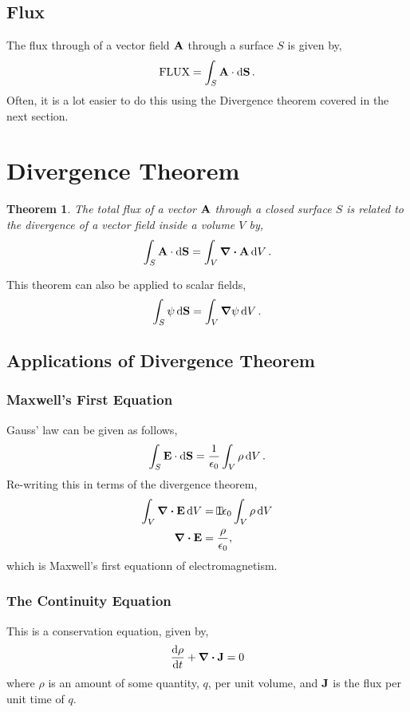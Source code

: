 \documentclass{book}
\newtheorem*{theorem}{Theorem}
\begin{document}
\subsection{Flux}
The flux through of a vector field $\vb{A}$ through a surface $S$ is given by,
\begin{equation}
    \text{FLUX} = \int_S\vb{A}\cdot\dd{\vb{S}}.
\end{equation}
Often, it is a lot easier to do this using the Divergence theorem covered in the next section.
\section{Divergence Theorem}
\begin{theorem}
    The total flux of a vector $\vb{A}$ through a closed surface $S$ is related to the divergence of a vector field inside a volume $V$ by,
    \begin{equation}
        \int_S \vb{A}\cdot\dd{\vb{S}} = \int_V\div{\vb{A}}\dd{V}.
    \end{equation}
\end{theorem}\noindent 
This theorem can also be applied to scalar fields,
\begin{equation}
    \int_S \psi \dd{\vb{S}} = \int_V\grad\psi \dd{V}.
\end{equation}
\subsection{Applications of Divergence Theorem}
\subsubsection{Maxwell's First Equation}
Gauss' law can be given as follows,
\begin{equation}
	\int_S \vb{E}\cdot\dd{\vb{S}} = \frac{1}{\epsilon_0}\int_V \rho \dd{V}.
\end{equation}
Re-writing this in terms of the divergence theorem,
\begin{equation}
	\begin{split}
		\int_V \div{\vb{E}}\dd{V} &= \frame{1}{\epsilon_0}\int_V \rho \dd{V}\\
		\div{\vb{E}} & = \frac{\rho}{\epsilon_0},
	\end{split}
\end{equation}
which is Maxwell's first equationn of electromagnetism.
\subsubsection{The Continuity Equation}
This is a conservation equation, given by,
\begin{equation}
	\dv{\rho}{t} + \div{\vb{J}} = 0
\end{equation}
where $\rho$ is an amount of some quantity, $q$, per unit volume, and $\vb{J}$ is the flux per unit time of $q$.
\end{document}
